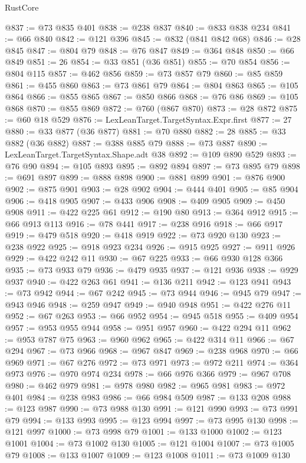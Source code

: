 \begin{lexlean}{RustCore}
\begin{coremodule}
@837 := @73 @835 @401
@838 := @238 @837
@840 := @833 @838 @234
@841 := @66 @840
@842 := @121 @396
@845 := @832 (@841 @842 @68)
@846 := @28 @845
@847 := @804 @79
@848 := @76 @847
@849 := @364 @848
@850 := @66 @849
@851 := 26
@854 := @33 @851 (@36 @851)
@855 := @70 @854
@856 := @804 @115
@857 := @462 @856
@859 := @73 @857 @79
@860 := @85 @859
@861 := @455 @860
@863 := @73 @861 @79
@864 := @804 @863
@865 := @105 @864
@866 := @855 @865
@867 := @850 @866
@868 := @76 @86
@869 := @105 @868
@870 := @855 @869
@872 := @760 (@867 @870)
@873 := @28 @872
@875 := @60 @18 @529
@876 := LexLeanTarget.TargetSyntax.Expr.first
@877 := 27
@880 := @33 @877 (@36 @877)
@881 := @70 @880
@882 := 28
@885 := @33 @882 (@36 @882)
@887 := @388 @885 @79
@888 := @73 @887
@890 := LexLeanTarget.TargetSyntax.Shape.adt @38
@892 := @109 @890 @529
@893 := @76 @90
@894 := @105 @893
@895 := @892 @894
@897 := @73 @895 @79
@898 := @691 @897
@899 := @888 @898
@900 := @881 @899
@901 := @876 @900
@902 := @875 @901
@903 := @28 @902
@904 := @444 @401
@905 := @85 @904
@906 := @418 @905
@907 := @433 @906
@908 := @409 @905
@909 := @450 @908
@911 := @422 @225 @61
@912 := @190 @80
@913 := @364 @912
@915 := @66 @913 @113
@916 := @78 @441
@917 := @238 @916
@918 := @66 @917
@919 := @479 @518
@920 := @418 @919
@922 := @73 @920 @130
@923 := @238 @922
@925 := @918 @923 @234
@926 := @915 @925
@927 := @911 @926
@929 := @422 @242 @11
@930 := @67 @225
@933 := @66 @930 @128 @366
@935 := @73 @933 @79
@936 := @479 @935
@937 := @121 @936
@938 := @929 @937
@940 := @422 @263 @61
@941 := @136 @211
@942 := @123 @941
@943 := @73 @942
@944 := @67 @242
@945 := @73 @944
@946 := @945 @79
@947 := @943 @946
@948 := @259 @947
@949 := @940 @948
@951 := @422 @276 @11
@952 := @67 @263
@953 := @66 @952
@954 := @945 @518
@955 := @409 @954
@957 := @953 @955 @944
@958 := @951 @957
@960 := @422 @294 @11
@962 := @953 @787 @75
@963 := @960 @962
@965 := @422 @314 @11
@966 := @67 @294
@967 := @73 @966
@968 := @967 @847
@969 := @238 @968
@970 := @66 @969
@971 := @67 @276
@972 := @73 @971
@973 := @972 @211
@974 := @364 @973
@976 := @970 @974 @234
@978 := @66 @976 @366
@979 := @967 @708
@980 := @462 @979
@981 := @978 @980
@982 := @965 @981
@983 := @972 @401
@984 := @238 @983
@986 := @66 @984 @509
@987 := @133 @208
@988 := @123 @987
@990 := @73 @988 @130
@991 := @121 @990
@993 := @73 @991 @79
@994 := @133 @993
@995 := @123 @994
@997 := @73 @995 @130
@998 := @121 @997
@1000 := @73 @998 @79
@1001 := @133 @1000
@1002 := @123 @1001
@1004 := @73 @1002 @130
@1005 := @121 @1004
@1007 := @73 @1005 @79
@1008 := @133 @1007
@1009 := @123 @1008
@1011 := @73 @1009 @130

\end{coremodule}
\end{lexlean}
